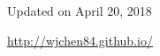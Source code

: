 \documentclass[UTF8,nofonts]{res}
\begin{document}
\begin{resume}
%

\vspace{0.3in}
\centerline{\footnotesize Updated on April 20, 2018}
\centerline{\footnotesize \url{http://wjchen84.github.io/}}

\end{resume}
\end{document}
